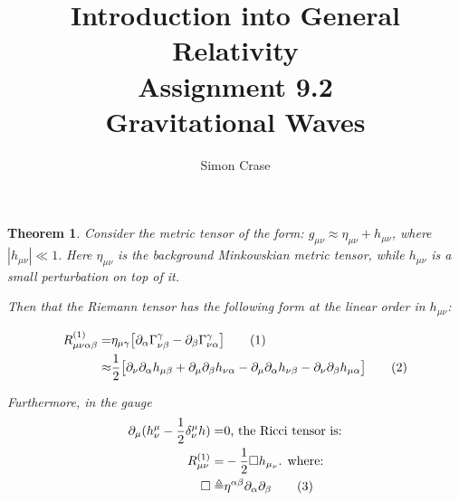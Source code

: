 \documentclass[]{article}
\title{Introduction into General Relativity\\Assignment 9.2\\Gravitational Waves}
\author{Simon Crase}
\newtheorem{theorem}{Theorem}
\newcommand\numberthis{\addtocounter{equation}{1}\tag{\theequation}}
\begin{document}
\maketitle
\thispagestyle{fancy}
\raggedright

\begin{theorem}\label{th:thethm}
Consider the metric tensor of the form: $g_{\mu\nu} \approx \eta_{\mu\nu} + h_{\mu\nu}$, where $|h_{\mu\nu}| \ll 1.$ Here $\eta_{\mu\nu}$ is the background Minkowskian metric tensor, while $h_{\mu\nu}$ is a small perturbation on top of it.

Then that the Riemann tensor has the following form at the linear order in $h_{\mu\nu}$:

\begin{align*}
R^{(1)}_{\mu\nu\alpha\beta} =& \eta_{\mu\gamma}\big[\partial_{\alpha}\Gamma^{\gamma}_{\nu\beta} - \partial_{\beta}\Gamma^{\gamma}_{\nu\alpha}\big]\numberthis\label{eq:R1}\\
\approx& \frac{1}{2}\big[\partial_{\nu}\partial_{\alpha}h_{\mu\beta} + \partial_{\mu}\partial_{\beta}h_{\nu\alpha} - \partial_{\mu}\partial_{\alpha}h_{\nu\beta} - \partial_{\nu}\partial_{\beta}h_{\mu\alpha}\big]\numberthis\label{eq:R2}
\end{align*}

Furthermore, in the gauge 
\begin{align*}
\partial_{\mu}(h^{\mu}_{\nu}-\frac{1}{2}\delta^{\mu}_{\nu}h)=&0\text{, the Ricci tensor is:}\\
R^{(1)}_{\mu\nu} =& - \frac{1}{2} \Box h_{\mu_{\nu}} \text{. where:}\\
\Box \triangleq & \eta^{\alpha\beta}\partial_{\alpha}\partial_{\beta} \numberthis\label{def:box}
\end{align*}
 
\end{theorem}
\end{document}

